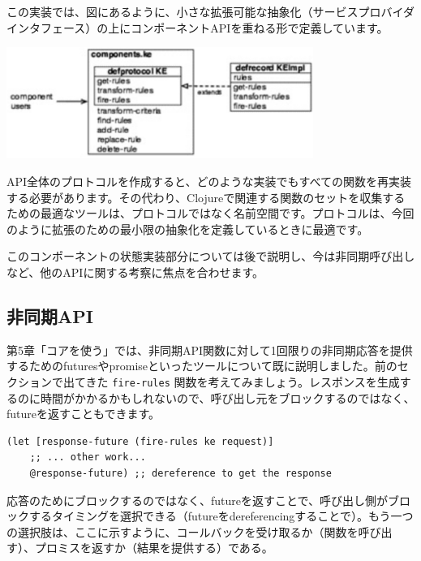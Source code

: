 この実装では、図にあるように、小さな拡張可能な抽象化（サービスプロバイダインタフェース）の上にコンポーネントAPIを重ねる形で定義しています。

\includegraphics[width=10cm]{fig_06_002.eps}

API全体のプロトコルを作成すると、どのような実装でもすべての関数を再実装する必要があります。その代わり、Clojureで関連する関数のセットを収集するための最適なツールは、プロトコルではなく名前空間です。プロトコルは、今回のように拡張のための最小限の抽象化を定義しているときに最適です。

このコンポーネントの状態実装部分については後で説明し、今は非同期呼び出しなど、他のAPIに関する考察に焦点を合わせます。


\subsection{非同期API}

第5章「コアを使う」では、非同期API関数に対して1回限りの非同期応答を提供するためのfuturesやpromiseといったツールについて既に説明しました。前のセクションで出てきた \texttt{fire-rules} 関数を考えてみましょう。レスポンスを生成するのに時間がかかるかもしれないので、呼び出し元をブロックするのではなく、futureを返すこともできます。

\begin{lstlisting}[numbers=none]
  (let [response-future (fire-rules ke request)]
    ;; ... other work...
    @response-future) ;; dereference to get the response
\end{lstlisting}

応答のためにブロックするのではなく、futureを返すことで、呼び出し側がブロックするタイミングを選択できる（futureをdereferencingすることで）。もう一つの選択肢は、ここに示すように、コールバックを受け取るか（関数を呼び出す）、プロミスを返すか（結果を提供する）である。








